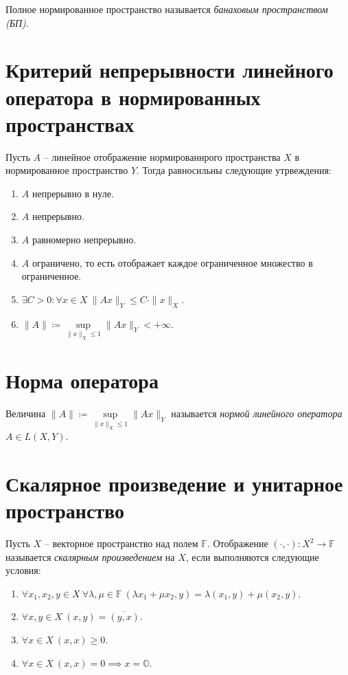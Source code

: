 \begin{definition}
	Полное нормированное пространство называется \emph{банаховым пространством (БП)}.
\end{definition}

\section{Критерий непрерывности линейного оператора в нормированных пространствах}

\begin{theorem}
	Пусть $A$ -- линейное отображение нормированнрого пространства $X$ в нормированное пространство $Y$. Тогда равносильны следующие утрвеждения:
	\begin{enumerate}
		\item $A$ непрерывно в нуле.
		\item $A$ непрерывно.
		\item $A$ равномерно непрерывно.
		\item $A$ ограничено, то есть отображает каждое ограниченное множество в ограниченное.
		\item $\exists C > 0 : \forall x \in X \ \|Ax\|_Y \leqslant C \cdot \|x\|_X$.
		\item $\|A\| \coloneq \underset{\|x\|_X \leqslant 1}{\sup} \|Ax\|_Y < +\infty $.
	\end{enumerate}
\end{theorem}

\section{Норма оператора}

\begin{definition}
	Величина $\|A\| \coloneq \underset{\|x\|_X \leqslant 1}{\sup} \|Ax\|_Y$ называется \emph{нормой линейного оператора} $A \in L(X,Y)$.
\end{definition}

\section{Скалярное произведение и унитарное пространство}

\begin{definition}
	Пусть $X$ -- векторное пространство над полем $\mathbb{F}$. Отображение $(\cdot,\cdot): X^2 \rightarrow \mathbb{F}$ называется \emph{скалярным произведением} на $X$, если выполняются следующие условия:
	\begin{enumerate}
		\item $\forall x_1,x_2,y \in X \ \forall \lambda ,\mu \in \mathbb{F} \ (\lambda x_1 + \mu x_2,y) = \lambda (x_1,y) + \mu (x_2,y)$.
		\item $\forall x,y \in X \ (x,y) = \overline{(y,x)} $.
		\item $\forall x \in X \ (x,x) \geqslant 0$.
		\item $\forall x \in X \ (x,x) = 0 \implies x = \mathbb{O}$.
	\end{enumerate}
\end{definition}

